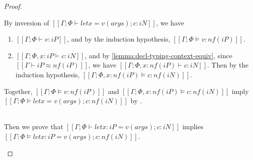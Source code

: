 \begin{proof}
\begin{caseof}
            By inversion of
            $[[Γ; Φ ⊢ let x = v(args); c : iN]]$,
            we have
            \begin{enumerate}
                \item $[[Γ; Φ ⊢ v : iP]]$, 
                    and by the induction hypothesis,
                    $[[Γ; Φ ⊨ v : nf(iP)]]$.
                \item $[[Γ; Φ, x:iP ⊢ c : iN]]$,
                    and by \cref{lemma:decl-typing-context-equiv},
                    since $[[Γ ⊢ iP ≈ nf(iP)]]$, we have
                    $[[Γ; Φ, x:nf(iP) ⊢ c : iN]]$.
                    Then by the induction hypothesis, 
                    $[[Γ; Φ, x:nf(iP) ⊨ c : nf(iN)]]$.
            \end{enumerate}

            Together, $[[Γ; Φ ⊨ v : nf(iP)]]$ and $[[Γ; Φ, x:nf(iP) ⊨ c : nf(iN)]]$
            imply $[[Γ; Φ ⊨ let x = v(args); c : nf(iN)]]$ by .

        \item {}\\
            Then we prove that 
            $[[Γ ; Φ ⊢ let x:iP = v(args); c : iN]]$
            implies 
            $[[Γ; Φ ⊨ let x:iP = v(args); c : nf(iN)]]$.


\end{caseof}
\end{proof}
